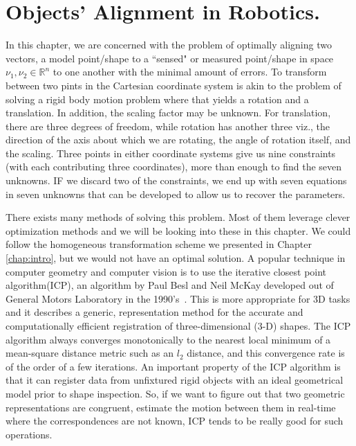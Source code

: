 \chapter{Objects' Alignment in Robotics.}  
 \label{chap:opt_rot::intro}
 
 In this chapter, we are concerned with the problem of optimally aligning two vectors, a model point/shape to a ``sensed" or measured point/shape in space \eg $\nu_1, \nu_2 \in \mathbb{R}^n$ to one another with the minimal amount of errors.
 To transform between two pints in the Cartesian coordinate system is akin to the problem of solving a rigid body motion problem where that yields a rotation and a translation. In addition, the scaling factor may be unknown. For translation, there are three degrees of freedom, while rotation has another three viz., the direction of the axis about which we are rotating,  the angle of rotation itself, and the scaling. Three points in either coordinate systems
 give us nine constraints (with each contributing three coordinates), more than enough to find the seven unknowns. IF we discard two of the constraints, we end up with seven equations in seven unknowns that can be developed to allow us to recover the parameters.
 
 There exists many methods of solving this problem. Most of them leverage clever optimization methods and we will be looking into these in this chapter. We could follow the homogeneous transformation scheme we presented in Chapter \ref{chap:intro}, but we would not have an optimal solution. A popular technique in computer geometry and computer vision is to use the iterative closest point algorithm(ICP), an algorithm by Paul Besl and Neil McKay developed out of General Motors Laboratory in the 1990's~\cite{besl1992method}. This is more appropriate for 3D tasks and it describes a generic, representation method for the accurate and computationally efficient registration of three-dimensional (3-D) shapes. The ICP algorithm always converges monotonically to the nearest local minimum of a mean-square distance metric such as an $l_2$ distance, and this convergence rate is of the order of a few iterations. An important property of the ICP algorithm is that it can register data from unfixtured rigid objects with an ideal geometrical model prior to shape inspection. So, if we want to figure out that two geometric representations are congruent, estimate the motion between them in real-time where the correspondences are not known, ICP tends to be really good for such operations.
 
